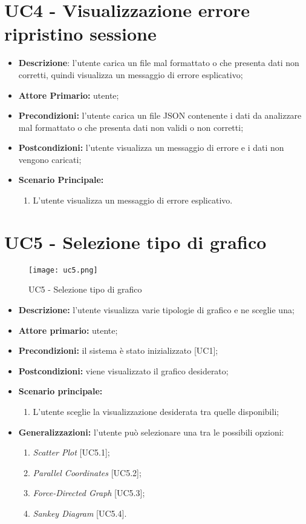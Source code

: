\section{UC4 - Visualizzazione errore ripristino sessione}
\begin{itemize}
  \item \textbf{Descrizione}: l'utente carica un file mal formattato o che presenta dati non corretti, quindi visualizza un messaggio di errore esplicativo;
  \item \textbf{Attore Primario:} utente;
  \item \textbf{Precondizioni:} l’utente carica un file JSON contenente i dati da analizzare mal formattato o che presenta dati non validi o non corretti;
  \item \textbf{Postcondizioni:} l'utente visualizza un messaggio di errore e i dati non vengono caricati;
  \item \textbf{Scenario Principale:}
  \begin{enumerate}
    \item L'utente visualizza un messaggio di errore esplicativo.
  \end{enumerate}
\end{itemize}

\section{UC5 - Selezione tipo di grafico}
\begin{figure}[H]
 \texttt{[image: uc5.png]}
 \caption{UC5 - Selezione tipo di grafico}
\end{figure}

 \begin{itemize}
     \item \textbf{Descrizione:} l'utente visualizza varie tipologie di grafico e ne sceglie una;
     \item \textbf{Attore primario:} utente;
     \item \textbf{Precondizioni:} il sistema è stato inizializzato [UC1];
     \item \textbf{Postcondizioni:} viene visualizzato il grafico desiderato;
     \item \textbf{Scenario principale:}
     \begin{enumerate}
       \item L'utente sceglie la visualizzazione desiderata tra quelle disponibili;
     \end{enumerate}
     \item \textbf{Generalizzazioni:} l'utente può selezionare una tra le possibili opzioni:
     \begin{enumerate}
         \item \textit{Scatter Plot} [UC5.1];
         \item \textit{Parallel Coordinates} [UC5.2];
         \item \textit{Force-Directed Graph} [UC5.3];
         \item \textit{Sankey Diagram} [UC5.4].
     \end{enumerate}
 \end{itemize}

